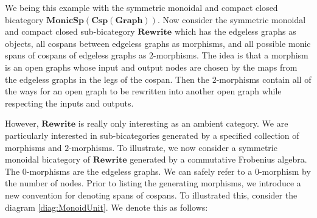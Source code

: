 \documentclass[11pt]{amsart}
\newcommand{\cat}[1]{\mathbf{#1}}
\newcommand{\bimonspcsp}[1]{\mathbf{MonicSp(Csp(#1))}}
\theoremstyle{remark}
\theoremstyle{definition}
\begin{document}
We being this example with the symmetric monoidal and compact closed bicategory $\bimonspcsp{Graph}$.  Now consider the symmetric monoidal and compact closed sub-bicategory $\cat{Rewrite}$ which has the edgeless graphs as objects, all cospans between edgeless graphs as morphisms, and all possible monic spans of cospans of edgeless graphs as $2$-morphisms.  The idea is that a morphism is an open graphs whose input and output nodes are chosen by the maps from the edgeless graphs in the legs of the cospan. Then the $2$-morphisms contain all of the ways for an open graph to be rewritten into another open graph while respecting the inputs and outputs. 

However, $\cat{Rewrite}$ is really only interesting as an ambient category.  We are particularly interested in sub-bicategories generated by a specified collection of morphisms and $2$-morphisms. To illustrate, we now consider a symmetric monoidal bicategory of $\cat{Rewrite}$ generated by a commutative Frobenius algebra.  The $0$-morphisms are the edgeless graphs. We can safely refer to a $0$-morphism by the number of nodes. Prior to listing the generating morphisms, we introduce a new convention for denoting spans of cospans. To illustrated this, consider the diagram \eqref{diag:MonoidUnit}.  We denote this as follows:
\end{document}
